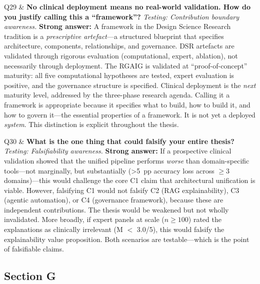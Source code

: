 \begin{xltabular}
Q29 & \textbf{No clinical deployment means no real-world validation. How do you justify calling this a ``framework''?} \newline
\textit{Testing: Contribution boundary awareness.} \newline\newline
\textbf{Strong answer:} A framework in the Design Science Research tradition is a \textit{prescriptive artefact}---a structured blueprint that specifies architecture, components, relationships, and governance. DSR artefacts are validated through rigorous evaluation (computational, expert, ablation), not necessarily through deployment. The RGAIG is validated at ``proof-of-concept'' maturity: all five computational hypotheses are tested, expert evaluation is positive, and the governance structure is specified. Clinical deployment is the \textit{next} maturity level, addressed by the three-phase research agenda. Calling it a framework is appropriate because it specifies what to build, how to build it, and how to govern it---the essential properties of a framework. It is not yet a deployed \textit{system}. This distinction is explicit throughout the thesis. \\
\addlinespace

Q30 & \textbf{What is the one thing that could falsify your entire thesis?} \newline
\textit{Testing: Falsifiability awareness.} \newline\newline
\textbf{Strong answer:} If a prospective clinical validation showed that the unified pipeline performs \textit{worse} than domain-specific tools---not marginally, but substantially (>5~pp accuracy loss across $\geq$3 domains)---this would challenge the core C1 claim that architectural unification is viable. However, falsifying C1 would not falsify C2 (RAG explainability), C3 (agentic automation), or C4 (governance framework), because these are independent contributions. The thesis would be weakened but not wholly invalidated. More broadly, if expert panels at scale ($n \geq 100$) rated the explanations as clinically irrelevant (M $<$ 3.0/5), this would falsify the explainability value proposition. Both scenarios are testable---which is the point of falsifiable claims. \\

\end{xltabular}

\subsection{Section G}
\label{sec:forty_point_audit}

